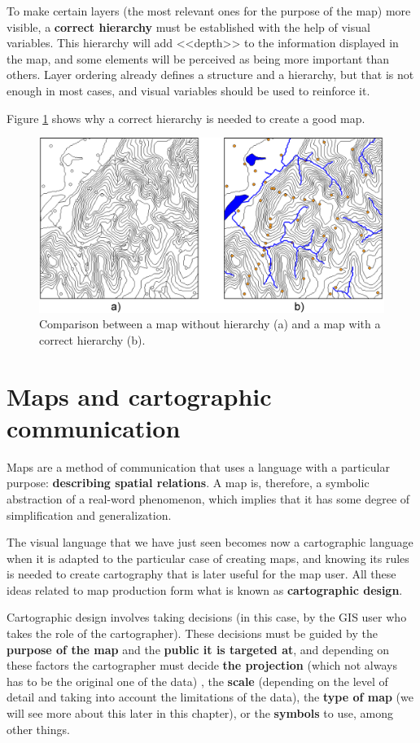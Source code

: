To make certain layers (the most relevant ones for the purpose of the map) more visible, a \textbf{correct hierarchy} must be established with the help of visual variables. This hierarchy will add <<depth>> to the information displayed in the map, and some elements will be perceived as being more important than others. Layer ordering already defines a structure and a hierarchy, but that is not enough in most cases, and visual variables should be used to reinforce it.

Figure \ref{Fig:HierarchyMap} shows why a correct hierarchy is needed to create a good map.

\begin{figure}[!hbt]
\centering
\includegraphics[width=\columnwidth]{Visualization/HierarchyMap.png}
\caption{\small Comparison between a map without hierarchy (a) and a map with a correct hierarchy (b).}
\label{Fig:HierarchyMap} 
\end{figure}


\section{Maps and cartographic communication}

Maps are a method of communication that uses a language with a particular purpose: \textbf{describing spatial relations}. A map is, therefore, a symbolic abstraction of a real-word phenomenon, which implies that it has some degree of simplification and generalization.

The visual language that we have just seen becomes now a cartographic language when it is adapted to the particular case of creating maps, and knowing its rules is needed to create cartography that is later useful for the map user. All these ideas related to map production form what is known as \textbf{cartographic design}.

Cartographic design involves taking decisions (in this case, by the GIS user who takes the role of the cartographer). These decisions must be guided by the \textbf{purpose of the map} and the \textbf{public it is targeted at}, and depending on these factors the cartographer must decide \textbf{the projection} (which not always has to be the original one of the data) 
, the \textbf{scale} (depending on the level of detail and taking into account the limitations of the data), the \textbf{type of map} (we will see more about this later in this chapter), or the \textbf{symbols} to use, among other things.

